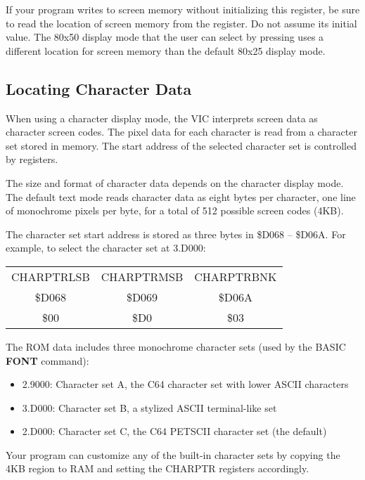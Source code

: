 If your program writes to screen memory without initializing this register, be sure to read the location of screen memory from the register. Do not assume its initial value. The 80x50 display mode that the user can select by pressing   uses a different location for screen memory than the default 80x25 display mode.

\subsection{Locating Character Data}

When using a character display mode, the VIC interprets screen data as character screen codes. The pixel data for each character is read from a character set stored in memory. The start address of the selected character set is controlled by registers.

The size and format of character data depends on the character display mode. The default text mode reads character data as eight bytes per character, one line of monochrome pixels per byte, for a total of 512 possible screen codes (4KB).

The character set start address is stored as three bytes in \$D068 -- \$D06A. For example, to select the character set at 3.D000:

\begin{center}
\begin{tabular}{|c|c|c|}
\hline
CHARPTRLSB & CHARPTRMSB & CHARPTRBNK \\
\$D068 & \$D069 & \$D06A \\
\hline
\$00 & \$D0 & \$03 \\
\hline
\end{tabular}
\end{center}

The ROM data includes three monochrome character sets (used by the BASIC {\bf FONT} command):

\begin{itemize}
\item 2.9000: Character set A, the C64 character set with lower ASCII characters
\item 3.D000: Character set B, a stylized ASCII terminal-like set
\item 2.D000: Character set C, the C64 PETSCII character set (the default)
\end{itemize}

Your program can customize any of the built-in character sets by copying the 4KB region to RAM and setting the CHARPTR registers accordingly.

